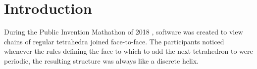\documentclass[mathematics,article,submit,pdftex,moreauthors]{Definitions/mdpi}
\begin{document}








\newcommand{\mathsym}[1]{{}}
\newcommand{\unicode}[1]{{}}

\newtheorem{observation}{Observation}





\section{Introduction}

During the Public Invention Mathathon of 2018 \cite{read2019mathathon}, software was
created to view chains of regular tetrahedra joined face-to-face.
The participants noticed whenever the rules
defining the face to which to add the next
tetrahedron
to were periodic, the resulting
structure was always like a discrete helix.
\end{document}
